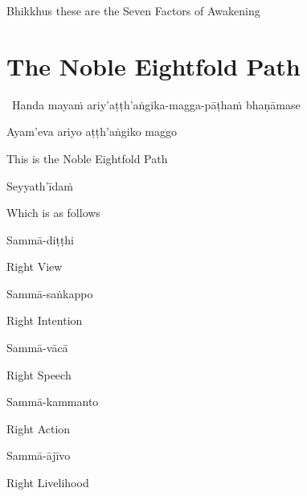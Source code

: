 \begin{english}
  Bhikkhus these are the Seven Factors of Awakening
\end{english}

\suttaRef{[SN 46.22]}

\ifdigital{}\fi



\section{The Noble Eightfold Path}
\label{noble-eightfold-path}

\begin{leader}
  \anglebracketleft\ \hspace{-0.5mm}Handa mayaṁ ariy'aṭṭh'aṅgika-magga-pāṭhaṁ bhaṇāmase \hspace{-0.5mm}\anglebracketright\
\end{leader}

Ayam'eva ariyo aṭṭh'aṅgiko maggo

\begin{english}
  This is the Noble Eightfold Path
\end{english}

Seyyath'īdaṁ

\begin{english}
  Which is as follows
\end{english}

Sammā-diṭṭhi

\begin{english}
  Right View
\end{english}

Sammā-saṅkappo

\begin{english}
  Right Intention
\end{english}

Sammā-vācā

\begin{english}
  Right Speech
\end{english}

Sammā-kammanto

\begin{english}
  Right Action
\end{english}

Sammā-ājīvo

\begin{english}
  Right Livelihood
\end{english}

